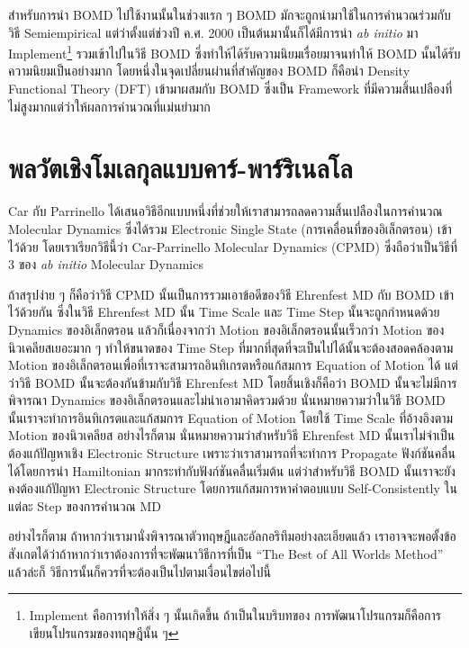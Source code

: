 สำหรับการนำ BOMD ไปใช้งานนั้นในช่วงแรก ๆ BOMD มักจะถูกนำมาใช้ในการคำนวณร่วมกับวิธี Semiempirical แต่ว่าตั้งแต่ช่วงปี ค.ศ. 2000
เป็นต้นมานั้นก็ได้มีการนำ \textit{ab initio} มา Implement\footnote{Implement คือการทำให้สิ่ง ๆ นั้นเกิดขึ้น ถ้าเป็นในบริบทของ%
การพัฒนาโปรแกรมก็คือการเขียนโปรแกรมของทฤษฎีนั้น ๆ} รวมเข้าไปในวิธี BOMD ซึ่งทำให้ได้รับความนิยมเรื่อยมาจนทำให้ BOMD
นั้นได้รับความนิยมเป็นอย่างมาก โดยหนึ่งในจุดเปลี่ยนผ่านที่สำคัญของ BOMD ก็คือนำ Density Functional Theory (DFT) เข้ามาผสมกับ BOMD
ซึ่งเป็น Framework ที่มีความสิ้นเปลืองที่ไม่สูงมากแต่ว่าให้ผลการคำนวณที่แม่นยำมาก

\section{พลวัตเชิงโมเลกุลแบบคาร์-พาร์ริเนลโล}

Car กับ Parrinello ได้เสนอวิธีอีกแบบหนึ่งที่ช่วยให้เราสามารถลดความสิ้นเปลืองในการคำนวณ Molecular Dynamics ซึ่งได้รวม Electronic
Single State (การเคลื่อนที่ของอิเล็กตรอน) เข้าไว้ด้วย โดยเราเรียกวิธีนี้ว่า Car-Parrinello Molecular Dynamics (CPMD) ซึ่งถือว่าเป็นวิธีที่
3 ของ \textit{ab initio} Molecular Dynamics

ถ้าสรุปง่าย ๆ ก็คือว่าวิธี CPMD นั้นเป็นการรวมเอาข้อดีของวิธี Ehrenfest MD กับ BOMD เข้าไว้ด้วยกัน ซึ่งในวิธี Ehrenfest MD นั้น Time Scale
และ Time Step นั้นจะถูกกำหนดด้วย Dynamics ของอิเล็กตรอน แล้วก็เนื่องจากว่า Motion ของอิเล็กตรอนนั้นเร็วกว่า Motion ของนิวเคลียสเยอะมาก ๆ
ทำให้ขนาดของ Time Step ที่มากที่สุดที่จะเป็นไปได้นั้นจะต้องสอดคล้องตาม Motion ของอิเล็กตรอนเพื่อที่เราจะสามารถอินทิเกรตหรือแก้สมการ
Equation of Motion ได้ แต่ว่าวิธี BOMD นั้นจะต้องกันข้ามกับวิธี Ehrenfest MD โดยสิ้นเชิงก็คือว่า BOMD นั้นจะไม่มีการพิจารณา Dynamics
ของอิเล็กตรอนและไม่นำเอามาคิดรวมด้วย นั่นหมายความว่าในวิธี BOMD นั้นเราจะทำการอินทิเกรตและแก้สมการ Equation of Motion โดยใช้
Time Scale ที่อ้างอิงตาม Motion ของนิวเคลียส อย่างไรก็ตาม นั่นหมายความว่าสำหรับวิธี Ehrenfest MD นั้นเราไม่จำเป็นต้องแก้ปัญหาเชิง
Electronic Structure เพราะว่าเราสามารถที่จะทำการ Propagate ฟังก์ชันคลื่นได้โดยการนำ Hamiltonian มากระทำกับฟังก์ชันคลื่นเริ่มต้น
แต่ว่าสำหรับวิธี BOMD นั้นเราจะยังคงต้องแก้ปัญหา Electronic Structure โดยการแก้สมการหาคำตอบแบบ Self-Consistently ในแต่ละ Step
ของการคำนวณ MD

อย่างไรก็ตาม ถ้าหากว่าเรามานั่งพิจารณาตัวทฤษฎีและอัลกอริทึมอย่างละเอียดแล้ว เราอาจจะพอตั้งข้อสังเกตได้ว่าถ้าหากว่าเราต้องการที่จะพัฒนาวิธีการที่เป็น
\enquote{The Best of All Worlds Method} แล้วล่ะก็ วิธีการนั้นก็ควรที่จะต้องเป็นไปตามเงื่อนไขต่อไปนี้

